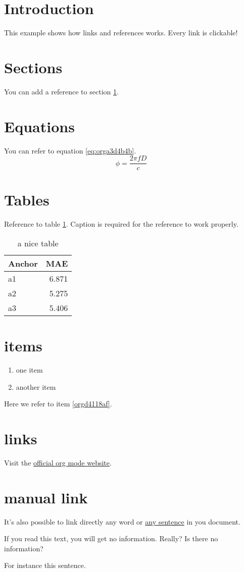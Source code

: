 


\section{Introduction}
\label{sec:org01531db}
This example shows how links and references works.
Every link is clickable!

\section{Sections}
\label{sec:org0a741a6}
You can add a reference to section \ref{sec:org01531db}.

\section{Equations}
\label{sec:orgdd5be60}
You can refer to equation \ref{eq:orga3d4b4b}.
\begin{equation}
\label{eq:orga3d4b4b}
\phi = \frac{2\pi fD}{c}
\end{equation}

\section{Tables}
\label{sec:org2901711}
Reference to table \ref{tab:orge8dc12c}.
Caption is required for the reference to work properly.

\begin{table}[htbp]
\caption{\label{tab:orge8dc12c}
a nice table}
\centering
\begin{tabular}{lr}
Anchor & MAE\\
\hline
a1 & 6.871\\
a2 & 5.275\\
a3 & 5.406\\
\end{tabular}
\end{table}

\section{items}
\label{sec:orgabff647}
\begin{enumerate}
\item one item
\item \label{orgd4118af}another item
\end{enumerate}
Here we refer to item \ref{orgd4118af}.

\section{links}
\label{sec:orgc8f8927}
Visit the \href{https://orgmode.org/}{official org mode website}.

\section{manual link}
\label{sec:orgda9bdda}
It's also possible to link directly any word
or \hyperlink{thesentence}{any sentence} in you document.

If you read this text, you will get no information.  Really?
Is there no information?

For instance \hypertarget{thesentence}{this sentence}.


